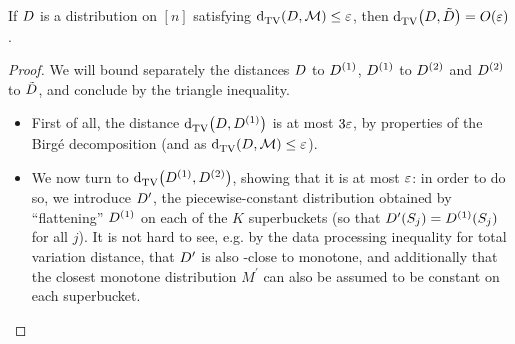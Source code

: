 \begin{lemma}\label{lemma:correct:waterfill:distance}
If $D$ is a distribution on $[n]$ satisfying ${\operatorname{d}_{\textrm{TV}}^{}\!\left({D, \mathcal{M}}\right)} \leq \varepsilon$, then $\totalvardist{\D}{\tilde{\D}} = \bigO{\eps}$.
\end{lemma}
\begin{proof}
We will bound separately the distances $D$ to $D^{(1)}$, $D^{(1)}$ to $D^{(2)}$ and $D^{(2)}$ to $\tilde{D}$, and conclude by the triangle inequality.
\begin{itemize}
  \item First of all, the distance ${\operatorname{d}_{\textrm{TV}}^{}\!\left({D, D^{(1)}}\right)}$ is at most $3\varepsilon$, by properties of the Birg\'e decomposition (and as ${\operatorname{d}_{\textrm{TV}}^{}\!\left({D, \mathcal{M}}\right)} \leq \varepsilon$).
  \item We now turn to ${\operatorname{d}_{\textrm{TV}}^{}\!\left({D^{(1)}, D^{(2)}}\right)}$, showing that it is at most $\varepsilon$: in order to do so, we introduce $D^\prime$, the piecewise-constant distribution obtained by ``flattening'' $D^{(1)}$ on each of the $K$ superbuckets (so that $D^\prime(S_j) = D^{(1)}(S_j)$ for all $j$). It is not hard to see, e.g. by the data processing inequality for total variation distance, that $D^\prime$ is also \eps-close to monotone, and additionally that the closest monotone distribution $M^\prime$ can also be assumed to be constant on each superbucket.


\end{itemize}
\end{proof}
